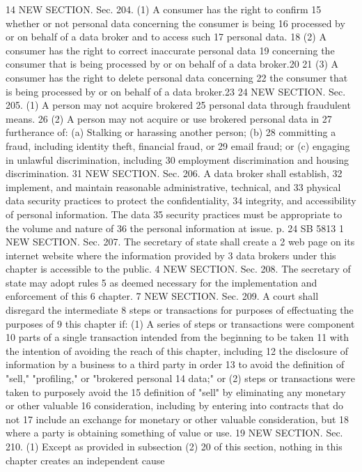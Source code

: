 14 NEW SECTION. Sec. 204. (1) A consumer has the right to confirm
15 whether or not personal data concerning the consumer is being
16 processed by or on behalf of a data broker and to access such
17 personal data.
18 (2) A consumer has the right to correct inaccurate personal data
19 concerning the consumer that is being processed by or on behalf of a
data broker.20
21 (3) A consumer has the right to delete personal data concerning
22 the consumer that is being processed by or on behalf of a data
broker.23
24 NEW SECTION. Sec. 205. (1) A person may not acquire brokered
25 personal data through fraudulent means.
26 (2) A person may not acquire or use brokered personal data in
27 furtherance of: (a) Stalking or harassing another person; (b)
28 committing a fraud, including identity theft, financial fraud, or
29 email fraud; or (c) engaging in unlawful discrimination, including
30 employment discrimination and housing discrimination.
31 NEW SECTION. Sec. 206. A data broker shall establish,
32 implement, and maintain reasonable administrative, technical, and
33 physical data security practices to protect the confidentiality,
34 integrity, and accessibility of personal information. The data
35 security practices must be appropriate to the volume and nature of
36 the personal information at issue.
p. 24 SB 5813
1 NEW SECTION. Sec. 207. The secretary of state shall create a
2 web page on its internet website where the information provided by
3 data brokers under this chapter is accessible to the public.
4 NEW SECTION. Sec. 208. The secretary of state may adopt rules
5 as deemed necessary for the implementation and enforcement of this
6 chapter.
7 NEW SECTION. Sec. 209. A court shall disregard the intermediate
8 steps or transactions for purposes of effectuating the purposes of
9 this chapter if: (1) A series of steps or transactions were component
10 parts of a single transaction intended from the beginning to be taken
11 with the intention of avoiding the reach of this chapter, including
12 the disclosure of information by a business to a third party in order
13 to avoid the definition of "sell," "profiling," or "brokered personal
14 data;" or (2) steps or transactions were taken to purposely avoid the
15 definition of "sell" by eliminating any monetary or other valuable
16 consideration, including by entering into contracts that do not
17 include an exchange for monetary or other valuable consideration, but
18 where a party is obtaining something of value or use.
19 NEW SECTION. Sec. 210. (1) Except as provided in subsection (2)
20 of this section, nothing in this chapter creates an independent cause
